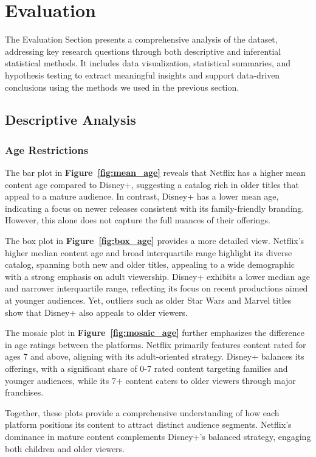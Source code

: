 \section{Evaluation}

The Evaluation Section presents a comprehensive analysis of the dataset, addressing key research questions through both descriptive and inferential statistical methods. It includes data visualization, statistical summaries, and hypothesis testing to extract meaningful insights and support data-driven conclusions using the methods we used in the previous section.

\subsection{Descriptive Analysis}
\subsubsection{Age Restrictions}

The bar plot in \textbf{Figure~\ref{fig:mean_age}} reveals that Netflix has a higher mean content age compared to Disney+, suggesting a catalog rich in older titles that appeal to a mature audience. In contrast, Disney+ has a lower mean age, indicating a focus on newer releases consistent with its family-friendly branding. However, this alone does not capture the full nuances of their offerings.

The box plot in \textbf{Figure~\ref{fig:box_age}} provides a more detailed view. Netflix's higher median content age and broad interquartile range highlight its diverse catalog, spanning both new and older titles, appealing to a wide demographic with a strong emphasis on adult viewership. Disney+ exhibits a lower median age and narrower interquartile range, reflecting its focus on recent productions aimed at younger audiences. Yet, outliers such as older Star Wars and Marvel titles show that Disney+ also appeals to older viewers.

The mosaic plot in \textbf{Figure~\ref{fig:mosaic_age}} further emphasizes the difference in age ratings between the platforms. Netflix primarily features content rated for ages 7 and above, aligning with its adult-oriented strategy. Disney+ balances its offerings, with a significant share of 0-7 rated content targeting families and younger audiences, while its 7+ content caters to older viewers through major franchises.

Together, these plots provide a comprehensive understanding of how each platform positions its content to attract distinct audience segments. Netflix's dominance in mature content complements Disney+'s balanced strategy, engaging both children and older viewers.

